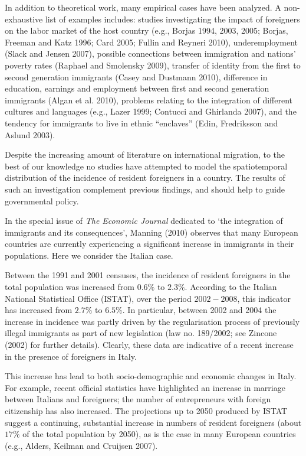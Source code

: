 \documentclass[10pt] {article}
\theoremstyle{definition}
\theoremstyle{plain}
\begin{document}
In addition to theoretical work, many empirical cases have been analyzed. A non-exhaustive list of examples includes: studies investigating the impact of foreigners on the labor market of the host country (e.g., Borjas 1994, 2003, 2005; Borjas, Freeman and Katz 1996; Card 2005; Fullin and Reyneri 2010), underemployment (Slack and Jensen 2007), possible connections between immigration and nations' poverty rates (Raphael and Smolensky 2009), transfer of identity from the first to second generation immigrants (Casey and Dustmann 2010), difference in education, earnings and employment between first and second generation immigrants (Algan et al. 2010), problems relating to the integration of different cultures and languages (e.g., Lazer 1999; Contucci and Ghirlanda 2007), and the tendency for immigrants to live in ethnic ``enclaves'' (Edin, Fredriksson and Aslund 2003). 

Despite the increasing amount of  literature on international migration, to the best of our knowledge no studies have attempted to model the spatiotemporal distribution of the incidence of resident foreigners in a country. The results of such an investigation complement previous findings, and should help to guide governmental policy. 

In the special issue of \textit{The Economic Journal} dedicated to `the integration of immigrants and its consequences', Manning (2010) observes that many European countries are currently experiencing a significant increase in immigrants in their populations. Here we consider the Italian case. 


Between the 1991 and 2001 censuses, the incidence of resident foreigners in the total population was increased from $0.6\%$ to $2.3\%$. According to the Italian National Statistical Office (ISTAT), over the period $2002-2008$, this indicator has increased from $2.7\%$ to $6.5\%$. In particular, between 2002 and 2004 the increase in incidence was partly driven by the regularisation process of previously illegal immigrants as part of new legislation (law no. 189/2002; see Zincone (2002) for further details). Clearly, these data are indicative of a recent increase in the presence of foreigners in Italy.

This increase has lead to both socio-demographic and economic changes in Italy. For example, recent official statistics have highlighted an increase in marriage between Italians and foreigners; the number of entrepreneurs with foreign citizenship has also increased. The projections up to 2050 produced by ISTAT suggest a continuing, substantial increase in numbers of resident foreigners (about $17\%$ of the total population by 2050), as is the case in many European countries (e.g., Alders, Keilman and Cruijsen 2007). 
\end{document}
